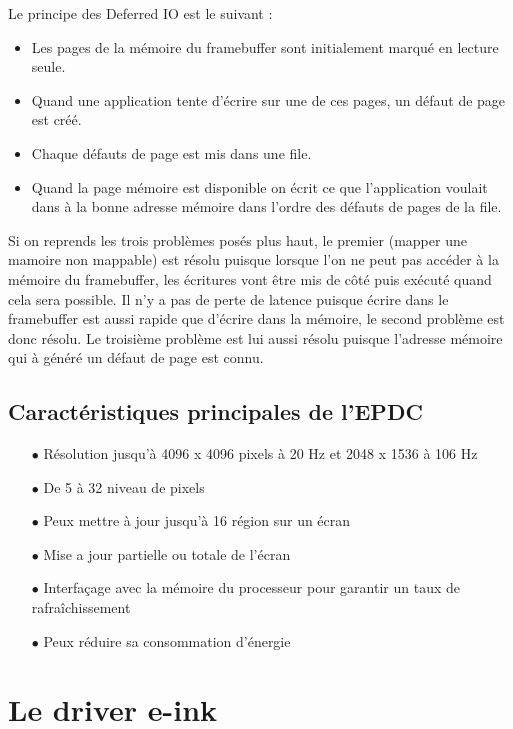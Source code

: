 Le principe des Deferred IO est le suivant :
\begin{itemize}
	\item Les pages de la mémoire du framebuffer sont initialement marqué en lecture seule.
	\item Quand une application tente d'écrire sur une de ces pages, un défaut de page est créé.
	\item Chaque défauts de page est mis dans une file.
	\item Quand la page mémoire est disponible on écrit ce que l'application voulait dans à la bonne adresse mémoire dans l'ordre des défauts de pages de la file. 
\end{itemize} 

Si on reprends les trois problèmes posés plus haut, le premier (mapper une mamoire non mappable) est résolu puisque lorsque l'on ne peut pas accéder à la mémoire du framebuffer, les écritures vont être mis de côté puis exécuté quand cela sera possible. 
Il n'y a pas de perte de latence puisque écrire dans le framebuffer est aussi rapide que d'écrire dans la mémoire, le second problème est donc résolu.
Le troisième problème est lui aussi résolu puisque l'adresse mémoire qui à généré un défaut de page est connu.
\subsection{Caractéristiques principales de l'EPDC}

\begin{itemize}
	\item[$\bullet$] Résolution jusqu'à 4096 x 4096 pixels à 20 Hz et 2048 x 1536 à 106 Hz
	\item[$\bullet$] De 5 à 32 niveau de pixels
	\item[$\bullet$] Peux mettre à jour jusqu'à 16 région sur un écran
	\item[$\bullet$] Mise a jour partielle ou totale de l'écran 
	\item[$\bullet$] Interfaçage avec la mémoire du processeur pour garantir un taux de rafraîchissement
	\item[$\bullet$] Peux réduire sa consommation d'énergie
\end{itemize}


\section{Le driver e-ink}


